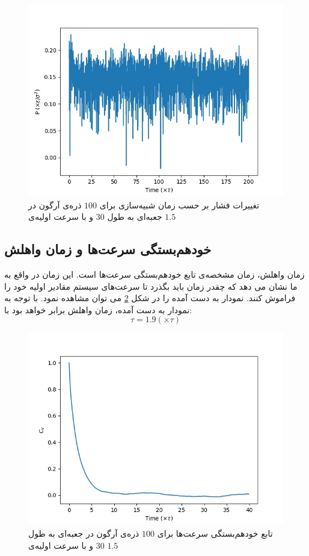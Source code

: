 \documentclass[11pt, a4paper]{article}
\begin{document}
\begin{figure}[h!]
	\centering
  \includegraphics[width=.7\textwidth]{MD_30_100_2_0.001_pressures.jpg}
  \caption{تغییرات فشار بر حسب زمان شبیه‌سازی برای $100$ ذره‌ی آرگون در جعبه‌ای به طول $30$ و با سرعت اولیه‌ی $1.5$}
  \label{fig:100_pressure}
\end{figure}


\subsection{خودهم‌بستگی سرعت‌ها و زمان واهلش}
زمان واهلش، زمان مشخصه‌ی تابع خود‌هم‌بستگی سرعت‌ها است.
این زمان در واقع به ما نشان می دهد که چقدر زمان باید بگذرد تا سرعت‌های سیستم مقادیر اولیه خود را فراموش کنند.
نمودار به دست آمده را در شکل
\ref{fig:100_c_v}
می توان مشاهده نمود.
با توجه به نمودار به دست آمده، زمان واهلش برابر خواهد بود با:
\begin{equation}
  \tau = 1.9 (\times \tau)
\end{equation}

\begin{figure}[h!]
	\centering
  \includegraphics[width=.7\textwidth]{MD_30_100_2_0.001_c_v.jpg}
  \caption{تابع خود‌هم‌بستگی سرعت‌ها برای $100$ ذره‌ی آرگون در جعبه‌ای به طول $30$ و با سرعت اولیه‌ی $1.5$}
  \label{fig:100_c_v}
\end{figure}
\end{document}
